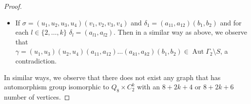 \documentclass[10pt,a4paper]{amsart}
\newcommand{\Aut}{\mathop{\mathrm{Aut}}}
\begin{document}
\begin{proof}
\begin{itemize}
			Observe that 
			\begin{align*}
				&\gamma([u_{i}, u_{j}]) = \sigma^{2}([u_{i}, u_{j}]) = \gamma([u_{i}, b_{1}]) = \gamma([v_{i}, b_{1}]) , \\
				& \gamma([u_{i}, v_{j}]) = \sigma^{i+j}\tau ([u_{i}, v_{j}]), \\
				&\gamma([u_{i}, a_{l1}]) = \sigma^{2} \delta_{1} \delta_{2} \ldots \delta_{k} ([u_{i}, a_{l1}]) = \gamma([u_{i}, a_{l2}]),\\
				&\gamma([v_{i}, v_{j}]) = e = \gamma([b_{1}, b_{2}]),\\
				&\gamma([v_{i}, a_{l1}]) = \delta_{1} \delta_{2} \ldots \delta_{k} ([v_{i}, a_{l1}]) = \gamma([v_{i}, a_{l2}]), \\
				&\gamma([a_{l1}, a_{m2}]) = \delta_{1} \delta_{2} \ldots \delta_{k} ([a_{l1}, a_{m2}]) = \gamma([b_{1}, a_{l1}]) = \gamma([b_{1}, a_{l2}]) .\\
			\end{align*}
			Hence $\gamma \in \Aut \Gamma_{2} \setminus S$, which is a contradiction.
			
			\item [(b)]   If $\sigma = (u_{1}, u_{2}, u_{3}, u_{4})(v_{1}, v_{2}, v_{3}, v_{4})$ and $\delta_{1} = (a_{11}, a_{12})(b_{1}, b_{2})$  and for each $l \in \{2,\ldots,k\}$ $\delta_{l} = (a_{l1}, a_{l2})$. Then in a similar way as above, we observe that\\
			$\gamma = (u_{1}, u_{3}) (u_{2}, u_{4})(a_{11}, a_{12})\ldots(a_{k1}, a_{k2})(b_{1}, b_{2}) \in \Aut \Gamma_{2} \setminus S$, a contradiction.
		\end{itemize}
		
		
		In similar ways, we observe that there does not exist any graph that has automorphism group isomorphic to $Q_{8} \times C_{2}^{k}$ with an $8+2k+4$ or $8+2k+6$ number of vertices.    
	\end{proof}
\end{document}
